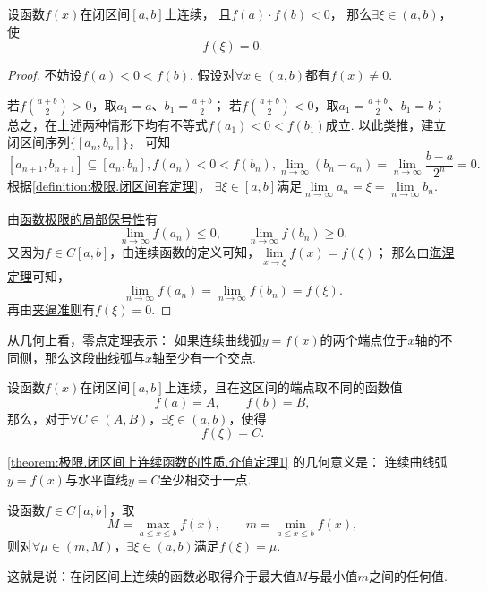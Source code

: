 \begin{theorem}[零点定理]\label{theorem:极限.闭区间上连续函数的性质.零点定理}
设函数\(f(x)\)在闭区间\([a,b]\)上连续，
且\(f(a) \cdot f(b)<0\)，
那么\(\exists\xi\in(a,b)\)，使\[
	f(\xi) = 0.
\]
\begin{proof}
不妨设\(f(a) < 0 < f(b)\).
假设对\(\forall x\in(a,b)\)都有\(f(x) \neq 0\).

若\(f\left(\frac{a+b}{2}\right)>0\)，取\(a_1=a\)、\(b_1=\frac{a+b}{2}\)；
若\(f\left(\frac{a+b}{2}\right)<0\)，取\(a_1=\frac{a+b}{2}\)、\(b_1=b\)；
总之，在上述两种情形下均有不等式\(f(a_1) < 0 < f(b_1)\)成立.
以此类推，建立闭区间序列\(\{[a_n,b_n]\}\)，
可知\[
[a_{n+1},b_{n+1}] \subseteq [a_n,b_n],
f(a_n) < 0 < f(b_n),
\lim\limits_{n\to\infty} (b_n - a_n)
= \lim\limits_{n\to\infty} \frac{b-a}{2^n}
= 0.
\]
根据\cref{definition:极限.闭区间套定理}，
\(\exists\xi\in[a,b]\)满足\(\lim\limits_{n\to\infty} a_n
= \xi
= \lim\limits_{n\to\infty} b_n\).

由\hyperref[theorem:极限.函数极限的局部保号性3]{函数极限的局部保号性}有\[
\lim\limits_{n\to\infty} f(a_n) \leq 0,
\qquad
\lim\limits_{n\to\infty} f(b_n) \geq 0.
\]
又因为\(f \in C[a,b]\)，由连续函数的定义可知，\(\lim\limits_{x\to\xi} f(x) = f(\xi)\)；
那么由\hyperref[theorem:极限.海涅定理]{海涅定理}可知，\[
\lim\limits_{n\to\infty} f(a_n)
= \lim\limits_{n\to\infty} f(b_n)
= f(\xi).
\]再由\hyperref[theorem:极限.夹逼准则]{夹逼准则}有\(f(\xi)=0\).
\end{proof}
\end{theorem}
从几何上看，零点定理表示：
如果连续曲线弧\(y = f(x)\)的两个端点位于\(x\)轴的不同侧，那么这段曲线弧与\(x\)轴至少有一个交点.

\begin{theorem}[介值定理]\label{theorem:极限.闭区间上连续函数的性质.介值定理1}
设函数\(f(x)\)在闭区间\([a,b]\)上连续，且在这区间的端点取不同的函数值\[
f(a) = A, \qquad
f(b) = B,
\]那么，对于\(\forall C \in (A,B)\)，\(\exists \xi \in (a,b)\)，使得\[
f(\xi) = C.
\]
\end{theorem}
\cref{theorem:极限.闭区间上连续函数的性质.介值定理1} 的几何意义是：
连续曲线弧\(y=f(x)\)与水平直线\(y=C\)至少相交于一点.

\begin{corollary}\label{theorem:极限.闭区间上连续函数的性质.介值定理2}
设函数\(f \in C[a,b]\)，取\[
M=\max_{a \leq x \leq b} f(x), \qquad
m=\min_{a \leq x \leq b} f(x),
\]则对\(\forall\mu\in(m,M)\)，\(\exists\xi\in(a,b)\)满足\(f(\xi)=\mu\).
\end{corollary}
这就是说：在闭区间上连续的函数必取得介于最大值\(M\)与最小值\(m\)之间的任何值.

